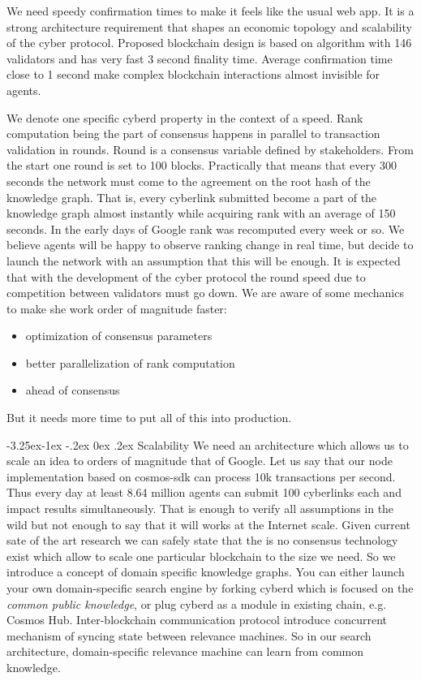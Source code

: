 \documentclass[8pt,oneside]{amsart}
\makeatletter
\newcommand{\linkred}[2]{\href{#1}{\color{red}{#2}}}
\newcommand{\linkgreen}[2]{\href{#1}{\color{green}{#2}}}
\renewcommand\subsection{\@startsection{subsection}{2}{\z@}%
                                     {-3.25ex\@plus -1ex \@minus -.2ex}%
                                     {0ex \@plus .2ex}%
                                     {\play\Large}}%
\newcommand{\titleSection}[1]{\subsection{#1}}
\newcommand{\code}[1]{{\PlayBold #1}}
\makeatother
\begin{document}
We need speedy confirmation times to make it feels like the usual web app. It is a strong architecture requirement that shapes an economic topology and scalability of the cyber protocol. Proposed blockchain design is based on \linkgreen{https://ipfs.io/ipfs/QmaMtD7xDgghqgjN62zWZ5TBGFiEjGQtuZBjJ9sMh816KJ}{Tendermint consensus} algorithm with 146 validators and has very fast 3 second finality time. Average confirmation time close to 1 second make complex blockchain interactions almost invisible for agents.

We denote one specific cyberd property in the context of a speed. Rank computation being the part of consensus happens in parallel to transaction validation in rounds. Round is a consensus variable defined by stakeholders. From the start one round is set to 100 blocks. Practically that means that every 300 seconds the network must come to the agreement on the root hash of the knowledge graph. That is, every cyberlink submitted become a part of the knowledge graph almost instantly while acquiring rank with an average of 150 seconds. In the early days of Google rank was recomputed every week or so. We believe agents will be happy to observe ranking change in real time, but decide to launch the network with an assumption that this will be enough. It is expected that with the development of the cyber protocol the round speed due to competition between validators must go down. We are aware of some mechanics to make she work order of magnitude faster:
\begin{itemize}
\item optimization of consensus parameters
\item better parallelization of rank computation
\item \linkred{https://medium.com/solana-labs/proof-of-history-a-clock-for-blockchain-cf47a61a9274}{better clock} ahead of consensus
\end{itemize}

But it needs more time to put all of this into production.

\titleSection{Scalability}\label{scalability}
We need an architecture which allows us to scale an idea to orders of magnitude that of Google. Let us say that our node implementation based on \code{cosmos-sdk} can process 10k transactions per second. Thus every day at least 8.64 million agents can submit 100 cyberlinks each and impact results simultaneously. That is enough to verify all assumptions in the wild but not enough to say that it will works at the Internet scale. Given current sate of the art research we can safely state that the is no consensus technology exist which allow to scale one particular blockchain to the size we need. So we introduce a concept of domain specific knowledge graphs. You can either launch your own domain-specific search engine by forking cyberd which is focused on the \textit{common public knowledge}, or plug cyberd as a module in existing chain, e.g. Cosmos Hub. Inter-blockchain communication protocol introduce concurrent mechanism of syncing state between relevance machines. So in our search architecture, domain-specific relevance machine can learn from common knowledge.
\end{document}
